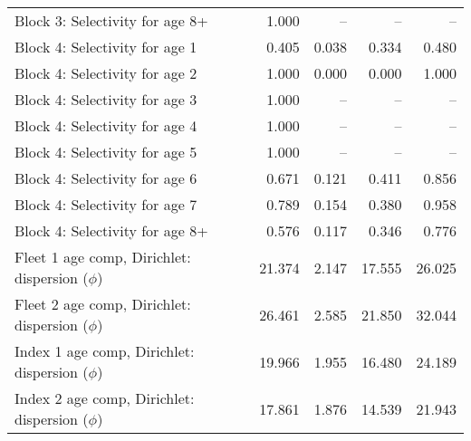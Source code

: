 \documentclass[
]{article}
\begin{document}
\begin{landscape}
\begin{longtable}[t]{lrrrr}
Block 3: Selectivity for age 8+ & 1.000 & -- & -- & --\\
Block 4: Selectivity for age 1 & 0.405 & 0.038 & 0.334 & 0.480\\
Block 4: Selectivity for age 2 & 1.000 & 0.000 & 0.000 & 1.000\\
Block 4: Selectivity for age 3 & 1.000 & -- & -- & --\\
Block 4: Selectivity for age 4 & 1.000 & -- & -- & --\\
\addlinespace
Block 4: Selectivity for age 5 & 1.000 & -- & -- & --\\
Block 4: Selectivity for age 6 & 0.671 & 0.121 & 0.411 & 0.856\\
Block 4: Selectivity for age 7 & 0.789 & 0.154 & 0.380 & 0.958\\
Block 4: Selectivity for age 8+ & 0.576 & 0.117 & 0.346 & 0.776\\
Fleet 1 age comp, Dirichlet: dispersion ($\phi$) & 21.374 & 2.147 & 17.555 & 26.025\\
\addlinespace
Fleet 2 age comp, Dirichlet: dispersion ($\phi$) & 26.461 & 2.585 & 21.850 & 32.044\\
Index 1 age comp, Dirichlet: dispersion ($\phi$) & 19.966 & 1.955 & 16.480 & 24.189\\
Index 2 age comp, Dirichlet: dispersion ($\phi$) & 17.861 & 1.876 & 14.539 & 21.943\\*
\end{longtable}
\end{landscape}
\end{document}

